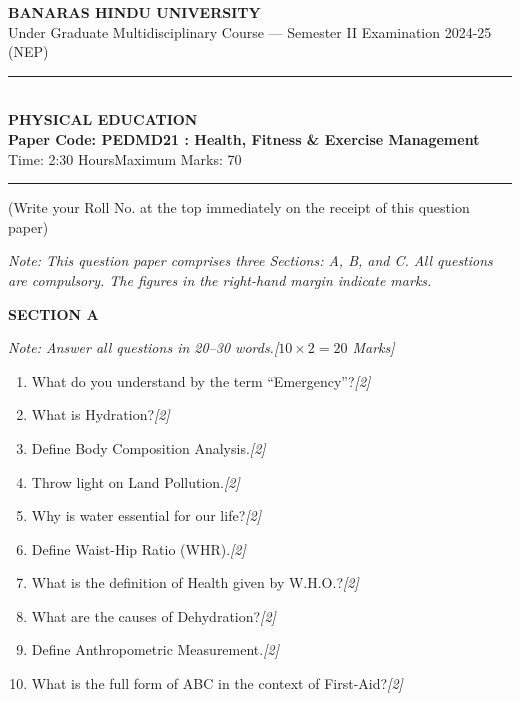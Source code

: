 \documentclass[11pt,a4paper]{article}
\newcommand{\pts}[1]{\hfill   \textit{[#1]}}
\begin{document}
\begin{center}
  {\large\bfseries BANARAS HINDU UNIVERSITY}\\[2pt]
  {\normalsize Under Graduate Multidisciplinary Course --- Semester II Examination 2024-25 (NEP)}\\[6pt]
  \rule{0.8\linewidth}{0.5pt}\\[6pt]
  {\large\bfseries PHYSICAL EDUCATION}\\[4pt]
  {\large\bfseries Paper Code: PEDMD21 : Health, Fitness \& Exercise Management}\\[4pt]
  {\normalsize Time: 2:30 Hours\hfill Maximum Marks: 70}
\end{center}

\rule{\linewidth}{0.4pt}

\smallskip



\noindent (Write your Roll No. at the top immediately on the receipt of this question paper)

\smallskip



\noindent   \textit{Note: This question paper comprises three Sections: A, B, and C. All questions are compulsory. The figures in the right-hand margin indicate marks.}

\bigskip

\centerline{   \textbf{SECTION A}}
\smallskip



\noindent   \textit{Note: Answer all questions in 20--30 words.\hfill [$10  \times 2 = 20$ Marks]}


\begin{enumerate}[label=   \textbf{\arabic*.}]
    \item What do you understand by the term ``Emergency''?\pts{2}
    \item What is Hydration?\pts{2}
    \item Define Body Composition Analysis.\pts{2}
    \item Throw light on Land Pollution.\pts{2}
    \item Why is water essential for our life?\pts{2}
    \item Define Waist-Hip Ratio (WHR).\pts{2}
    \item What is the definition of Health given by W.H.O.?\pts{2}
    \item What are the causes of Dehydration?\pts{2}
    \item Define Anthropometric Measurement.\pts{2}
    \item What is the full form of ABC in the context of First-Aid?\pts{2}
\end{enumerate}
\end{document}

